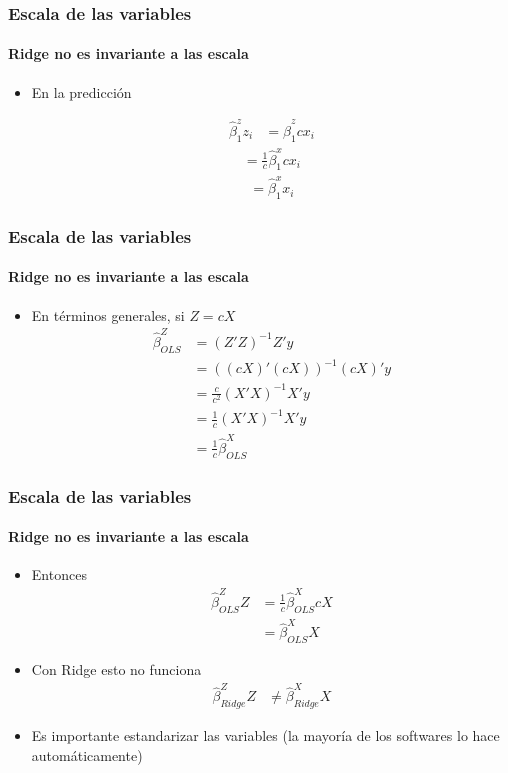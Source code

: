 \documentclass[
  shownotes,
  xcolor={svgnames},
  hyperref={colorlinks,citecolor=DarkBlue,linkcolor=andesred,urlcolor=DarkBlue}
  , aspectratio=169]{beamer}
\begin{document}
\begin{frame}[fragile]
\frametitle{Escala de las variables}
\framesubtitle{Ridge no es invariante a las escala}
\begin{itemize}
  \item En la predicción
  

  \begin{align}
  \hat{\beta}^z_{1}z_i &=\hat{\beta}^z_{1}cx_i 
\end{align}
    \begin{align}
  =\frac{1}{c}\hat{\beta}^x_1cx_i 
  \end{align}
\begin{align}
  =\hat{\beta}^x_1 x_i
  \end{align}
  
  
\end{itemize}
\end{frame}
\begin{frame}[fragile]
\frametitle{Escala de las variables}
\framesubtitle{Ridge no es invariante a las escala}
\begin{itemize}
  
  \item En términos generales, si $Z=cX$
  \begin{align*}
    \hat{\beta}^Z_{OLS}  &= (Z'Z)^{-1} Z' y \\
                         &= ((cX)'(cX))^{-1} (cX)' y \\
                         &= \frac{c}{c^2}(X'X)^{-1} X' y \\
                         &= \frac{1}{c}(X'X)^{-1} X' y  \\
                         &= \frac{1}{c} \hat{\beta}^X_{OLS}
  \end{align*} 
\end{itemize}

  \end{frame}
\begin{frame}[fragile]
\frametitle{Escala de las variables}
\framesubtitle{Ridge no es invariante a las escala}
\begin{itemize}
  \item Entonces
  \begin{align*}
  \hat{\beta}^Z_{OLS} Z  &=  \frac{1}{c} \hat{\beta}^X_{OLS} cX \\
                         &= \hat{\beta}^X_{OLS} X
  \end{align*} 
\medskip
  \item Con Ridge esto no funciona
    \begin{align*}
  \hat{\beta}^Z_{Ridge} Z &\neq  \hat{\beta}^X_{Ridge} X
  \end{align*} 

\item Es importante estandarizar las variables (la mayoría de los softwares lo hace automáticamente)
\end{itemize}


\end{frame}
\end{document}
